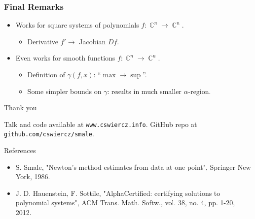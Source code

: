 \documentclass{beamer}
\DeclareMathOperator{\CC}{\mathbb{C}}
\begin{document}
\begin{frame}
  \frametitle{Final Remarks}

  \begin{itemize}
  \item<1-> Works for square systems of polynomials $f : \CC^n \to
    \CC^n$.
    \begin{itemize}
    \item<2-> Derivative $f' \to$ Jacobian $Df$.
    \end{itemize}
  \item<3-> Even works for smooth functions $f : \CC^n \to \CC^n$.
    \begin{itemize}
    \item<4-> Definition of $\gamma(f,x)$: ``$\max \to \sup$''.
    \item<5-> Some simpler bounds on $\gamma$: results in much smaller
      $\alpha$-region.
    \end{itemize}
  \end{itemize}
\end{frame}



\begin{frame}
  \begin{center}

    \vspace{32pt}

    {\Huge Thank you}

    \vspace{24pt}

    Talk and code available at {\tt www.cswiercz.info}. GitHub repo at {\tt
      github.com/cswiercz/smale}.
  \end{center}

  \vspace{32pt}

  {\tiny
  \begin{block}{References}
    \begin{itemize}
    \item S. Smale, "Newton's method estimates from data at one point", Springer
      New York, 1986.
    \item J. D. Hauenstein, F. Sottile, "AlphaCertified: certifying solutions to
      polynomial systems", ACM Trans. Math. Softw., vol. 38, no. 4, pp. 1-20,
      2012.
    \end{itemize}
  \end{block}
  }
\end{frame}


\end{document}

